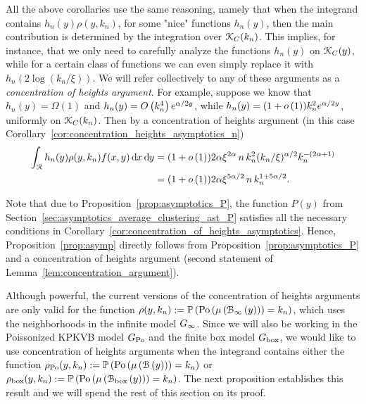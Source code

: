 \begin{remark}\label{rmk:concentration_argument}
All the above corollaries use the same reasoning, namely that when the integrand contains $h_n(y) \rho(y,k_n)$, for some "nice" functions $h_n(y)$, then the main contribution is determined by the integration over ${\mathcal K}_{C}(k_n)$.  This implies, for instance, that we only need to carefully analyze the functions $h_n(y)$ on ${\mathcal K}_{C}(y)$, while for a certain class of functions we can even simply replace it with $h_n(2\log(k_n/\xi))$. We will refer collectively to any of these arguments as a \emph{concentration of heights argument}. For example, suppose we know that $h_n(y) = \Omega(1)$ and $h_n(y) = O\left(k_n^4\right) e^{\alpha/2 y}$, while $h_n(y) = (1 + o\left(1\right)) k_n^2 e^{\alpha/2 y}$, uniformly on ${\mathcal K}_{C}(k_n)$. Then by a concentration of heights argument (in this case Corollary~\ref{cor:concentration_heights_asymptotics_n})
\begin{align*}
	\int_{{\mathcal R}} h_n(y) \rho(y,k_n) f(x,y) \operatorname{\mathrm{d}\hspace{-2pt}} x \operatorname{\mathrm{d}\hspace{-2pt}} y 
	&= (1 + o\left(1\right)) 2 \alpha \xi^{2\alpha} \, n \, k_n^2 (k_n/\xi)^{\alpha/2} k_n^{-(2\alpha + 1)} \\
	&= (1 + o\left(1\right)) 2\alpha \xi^{5\alpha/2} \, n \, k_n^{1 + 5\alpha/2}.
\end{align*}
\end{remark}



\begin{remark}
Note that due to Proposition~\ref{prop:asymptotics_P}, the function $P(y)$ from Section~\ref{sec:asymptotics_average_clustering_ast_P} satisfies all the necessary conditions in Corollary~\ref{cor:concentration_of_heights_asymptotics}. Hence, Proposition~\ref{prop:asymp} directly follows from Proposition~\ref{prop:asymptotics_P} and a concentration of heights argument (second statement of Lemma~\ref{lem:concentration_argument}).
\end{remark}

Although powerful, the current versions of the concentration of heights arguments are only valid for the function $\rho(y,k_n) := \mathbb{P}\left({\mathrm{Po}}\left(\mu\left({\mathcal B}_{\infty}\left(y\right)\right)\right) = k_n\right)$, which uses the neighborhoods in the infinite model $G_{\infty}$. Since we will also be working in the Poissonized KPKVB model $G_{\text{Po}}$ and the finite box model $G_{\text{box}}$, we would like to use concentration of heights arguments when the integrand contains either the function $\rho_{{\mathrm{Po}}}(y,k_n) := \mathbb{P}\left({\mathrm{Po}}\left(\mu\left({\mathcal B}\left(y\right)\right)\right) = k_n\right)$ or $\rho_{\text{box}}(y,k_n) := \mathbb{P}\left({\mathrm{Po}}\left(\mu\left({\mathcal B}_{\text{box}}\left(y\right)\right)\right) = k_n\right)$. The next proposition establishes this result and we will spend the rest of this section on its proof.

